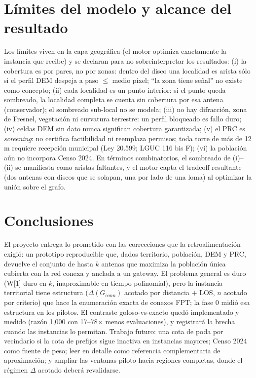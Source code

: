 \documentclass[12pt,letterpaper]{article}
\begin{document}
\section{Límites del modelo y alcance del resultado}
Los límites viven en la capa geográfica (el motor optimiza exactamente la instancia que recibe) y se declaran para no sobreinterpretar los resultados: (i) la cobertura es por pares, no por zonas: dentro del disco una localidad es arista sólo si el perfil DEM despeja a paso $\le$ medio píxel; ``la zona tiene señal'' no existe como concepto; (ii) cada localidad es un punto interior: si el punto queda sombreado, la localidad completa se cuenta sin cobertura por esa antena (conservador); el sombreado sub-local no se modela; (iii) no hay difracción, zona de Fresnel, vegetación ni curvatura terrestre: un perfil bloqueado es fallo duro; (iv) celdas DEM sin dato nunca significan cobertura garantizada; (v) el PRC es \emph{screening}: no certifica factibilidad ni reemplaza permisos; toda torre de más de 12 m requiere recepción municipal (Ley 20.599; LGUC 116 bis F); (vi) la población aún no incorpora Censo 2024. En términos combinatorios, el sombreado de (i)--(ii) se manifiesta como aristas faltantes, y el motor capta el tradeoff resultante (dos antenas con discos que se solapan, una por lado de una loma) al optimizar la unión sobre el grafo.

\section{Conclusiones}
El proyecto entrega lo prometido con las correcciones que la retroalimentación exigió: un prototipo reproducible que, dados territorio, población, DEM y PRC, devuelve el conjunto de hasta $k$ antenas que maximiza la población única cubierta con la red conexa y anclada a un gateway. El problema general es duro (W[1]-duro en $k$, inaproximable en tiempo polinomial), pero la instancia territorial tiene estructura ($\Delta(G_{conn})$ acotado por distancia + LOS, $n$ acotado por criterio) que hace la enumeración exacta de conexos FPT; la fase 0 midió esa estructura en los pilotos. El contraste goloso-vs-exacto quedó implementado y medido (razón 1,000 con 17--78$\times$ menos evaluaciones), y registrará la brecha cuando las instancias lo permitan. Trabajo futuro: una cota de poda por vecindario si la cota de prefijos sigue inactiva en instancias mayores; Censo 2024 como fuente de peso; leer en detalle \cite{dangelo2025} como referencia complementaria de aproximación; y ampliar las ventanas piloto hacia regiones completas, donde el régimen $\Delta$ acotado deberá revalidarse.
\end{document}
